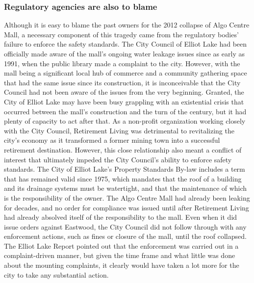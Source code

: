 \documentclass[12pt]{article}
\begin{document}
\subsubsection{Regulatory agencies are also to blame}

Although it is easy to blame the past owners for the 2012 collapse of Algo Centre Mall, a necessary component of this tragedy came from the regulatory bodies' failure to enforce the safety standards. The City Council of Elliot Lake had been officially made aware of the mall's ongoing water leakage issues since as early as 1991, when the public library made a complaint to the city. However, with the mall being a significant local hub of commerce and a community gathering space that had the same issue since its construction, it is inconceivable that the City Council had not been aware of the issues from the very beginning. Granted, the City of Elliot Lake may have been busy grappling with an existential crisis that occurred between the mall's construction and the turn of the century, but it had plenty of capacity to act after that. As a non-profit organization working closely with the City Council, Retirement Living was detrimental to revitalizing the city's economy as it transformed a former mining town into a successful retirement destination. However, this close relationship also meant a conflict of interest that ultimately impeded the City Council's ability to enforce safety standards. The City of Elliot Lake's Property Standards By-law includes a term that has remained valid since 1975, which mandates that the roof of a building and its drainage systems must be watertight, and that the maintenance of which is the responsibility of the owner. The Algo Centre Mall had already been leaking for decades, and no order for compliance was issued until after Retirement Living had already absolved itself of the responsibility to the mall. Even when it did issue orders against Eastwood, the City Council did not follow through with any enforcement actions, such as fines or closure of the mall, until the roof collapsed. The Elliot Lake Report pointed out that the enforcement was carried out in a complaint-driven manner, but given the time frame and what little was done about the mounting complaints, it clearly would have taken a lot more for the city to take any substantial action. 
\end{document}
